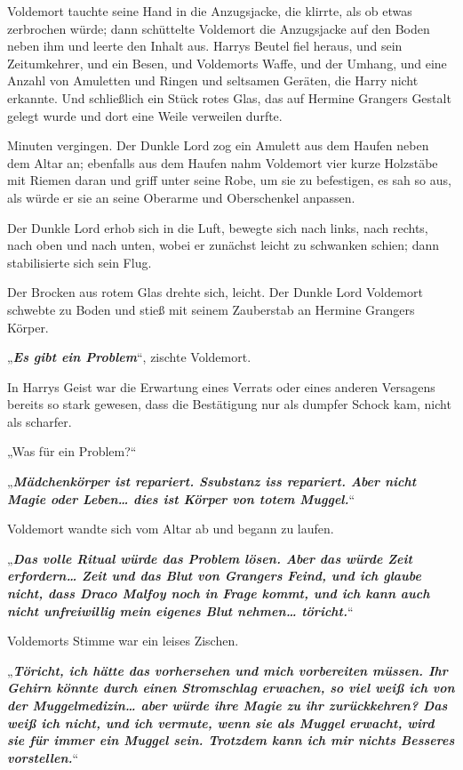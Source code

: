 {Voldemort tauchte seine Hand in die Anzugsjacke, die klirrte, als ob etwas zerbrochen würde; dann schüttelte Voldemort die Anzugsjacke auf den Boden neben ihm und leerte den Inhalt aus. Harrys Beutel fiel heraus, und sein Zeitumkehrer, und ein Besen, und Voldemorts Waffe, und der Umhang, und eine Anzahl von Amuletten und Ringen und seltsamen Geräten, die Harry nicht erkannte. Und schließlich ein Stück rotes Glas, das auf Hermine Grangers Gestalt gelegt wurde und dort eine Weile verweilen durfte.

Minuten vergingen. Der Dunkle Lord zog ein Amulett aus dem Haufen neben dem Altar an; ebenfalls aus dem Haufen nahm Voldemort vier kurze Holzstäbe mit Riemen daran und griff unter seine Robe, um sie zu befestigen, es sah so aus, als würde er sie an seine Oberarme und Oberschenkel anpassen.

Der Dunkle Lord erhob sich in die Luft, bewegte sich nach links, nach rechts, nach oben und nach unten, wobei er zunächst leicht zu schwanken schien; dann stabilisierte sich sein Flug.

Der Brocken aus rotem Glas drehte sich, leicht. Der Dunkle Lord Voldemort schwebte zu Boden und stieß mit seinem Zauberstab an Hermine Grangers Körper.

„\textbf{\emph{Es gibt ein Problem}}“, zischte Voldemort.

In Harrys Geist war die Erwartung eines Verrats oder eines anderen Versagens bereits so stark gewesen, dass die Bestätigung nur als dumpfer Schock kam, nicht als scharfer.

„Was für ein Problem?“

„\textbf{\emph{Mädchenkörper ist repariert. Ssubstanz iss repariert. Aber nicht Magie oder Leben… dies ist Körper von totem Muggel.}}“

Voldemort wandte sich vom Altar ab und begann zu laufen.

„\textbf{\emph{Das volle Ritual würde das Problem lösen. Aber das würde Zeit erfordern… Zeit und das Blut von Grangers Feind, und ich glaube nicht, dass Draco Malfoy noch in Frage kommt, und ich kann auch nicht unfreiwillig mein eigenes Blut nehmen… töricht.}}“

Voldemorts Stimme war ein leises Zischen.

„\textbf{\emph{Töricht, ich hätte das vorhersehen und mich vorbereiten müssen. Ihr Gehirn könnte durch einen Stromschlag erwachen, so viel weiß ich von der Muggelmedizin… aber würde ihre Magie zu ihr zurückkehren? Das weiß ich nicht, und ich vermute, wenn sie als Muggel erwacht, wird sie für immer ein Muggel sein. Trotzdem kann ich mir nichts Besseres vorstellen.}}“

}
